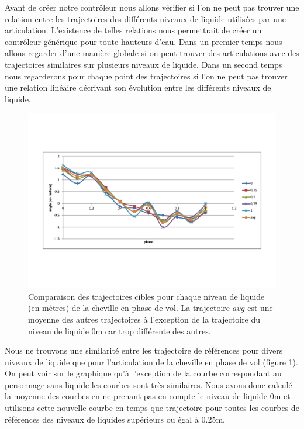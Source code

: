 \documentclass[runningheads,a4paper]{llncs}
\begin{document}
Avant de créer notre contrôleur nous allons vérifier si l'on ne peut pas trouver une relation entre les trajectoires des différents niveaux de liquide utilisées par une articulation. L'existence de telles relations nous permettrait de créer un contrôleur générique pour toute hauteurs d'eau. Dans un premier temps nous allons regarder d'une manière globale si on peut trouver des articulations avec des trajectoires similaires sur plusieurs niveaux de liquide. Dans un second temps nous regarderons pour chaque point des trajectoires si l'on ne peut pas trouver une relation linéaire décrivant son évolution entre les différents niveaux de liquide.

\begin{figure}[h]
\centering
\includegraphics[scale=0.4]{trajs_swing_ankle.pdf}
\caption{Comparaison des trajectoires cibles pour chaque niveau de liquide (en mètres) de la cheville en phase de vol. La trajectoire $avg$ est une moyenne des autres trajectoires à l'exception de la trajectoire du niveau de liquide 0m car trop différente des autres.}
\label{fig:comp_traj_swing_foot}
\end{figure}

Nous ne trouvons une similarité entre les trajectoire de références pour divers niveaux de liquide que pour l'articulation de la cheville en phase de vol (figure \ref{fig:comp_traj_swing_foot}). On peut voir sur le graphique qu'à l'exception de la courbe correspondant au personnage sans liquide les courbes sont très similaires. Nous avons donc calculé la moyenne des courbes en ne prenant pas en compte le niveau de liquide 0m et utilisons cette nouvelle courbe en temps que trajectoire pour toutes les courbes de références des niveaux de liquides supérieurs ou égal à 0.25m. 
\end{document}
